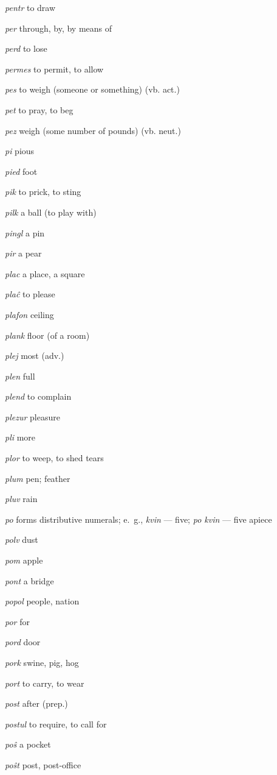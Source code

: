 \begin{landscape}
\begin{multicols}{5}
\begin{outdent}{1em}
\emph{pentr}  to draw

\emph{per}  through, by, by means of 

\emph{perd} to lose

\emph{permes}  to permit, to allow

\emph{pes}  to weigh (someone or something) (vb. act.)

\emph{pet}  to pray, to beg

\emph{pez}  weigh (some number of pounds) (vb. neut.)

\emph{pi}  pious

\emph{pied} foot

\emph{pik}  to prick, to sting

\emph{pilk } a ball (to play with)

\emph{pingl}  a pin

\emph{pir}  a pear

\emph{plac}  a place, a square

\emph{plaĉ}  to please

\emph{plafon}  ceiling

\emph{plank}  floor (of a room)

\emph{plej } most (adv.)

\emph{plen}  full

\emph{plend}  to complain

\emph{plezur}  pleasure

\emph{pli}  more

\emph{plor } to weep, to shed tears

\emph{plum}  pen; feather

\emph{pluv } rain

\emph{po}  forms distributive numerals; e.~g., \emph{kvin} — five; \emph{po kvin} — five apiece

\emph{polv}  dust

\emph{pom}  apple

\emph{pont}  a bridge

\emph{popol}  people, nation

\emph{por } for

\emph{pord}  door

\emph{pork}  swine, pig, hog

\emph{port}  to carry, to wear

\emph{post}  after (prep.)

\emph{postul}  to require, to call for

\emph{poŝ}  a pocket

\emph{poŝt}  post, post-office


\end{outdent}
\end{multicols}
\end{landscape}
